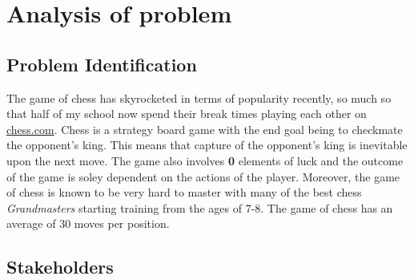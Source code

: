 \section{Analysis of problem}
\subsection{Problem Identification}
The game of chess has skyrocketed in terms of popularity
recently, so much so that half of my school now spend their
break times playing each other on \url{chess.com}. Chess 
is a strategy board game with the end goal being to checkmate
the opponent's king. This means that capture of 
the opponent's king is inevitable upon the next move. The 
game also involves \textbf{0} elements of luck and the 
outcome of the game is soley dependent on the actions of the
player. Moreover, the game of chess is known to be very
hard to master with many of the best chess
\textit{Grandmasters} starting training from the
ages of 7-8. The game of chess has an average of 30 moves 
per position.


\subsection{Stakeholders}
